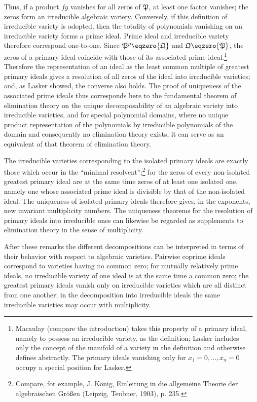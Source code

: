 \documentclass[11pt]{article}
\newcommand{\ideal}[1]{\mathfrak{#1}}
\begin{document}
Thus, if a product $fg$ vanishes for all zeros of $\ideal P$, at least one factor vanishes; the zeros form an irreducible algebraic variety. Conversely, if this definition of irreducible variety is adopted, then the totality of polynomials vanishing on an irreducible variety forms a prime ideal. Prime ideal and irreducible variety therefore correspond one-to-one. Since $\ideal P^\rho\eqzero{\ideal Q}$ and $\ideal Q\eqzero{\ideal P}$, the zeros of a primary ideal coincide with those of its associated prime ideal.\footnote{Macaulay (compare the introduction) takes this property of a primary ideal, namely to possess an irreducible variety, as the definition; Lasker includes only the concept of the manifold of a variety in the definition and otherwise defines abstractly. The primary ideals vanishing only for $x_1=0,
\ldots,x_n=0$ occupy a special position for Lasker.} Therefore the representation of an ideal as the least common multiple of greatest primary ideals gives a resolution of all zeros of the ideal into irreducible varieties; and, as Lasker showed, the converse also holds. The proof of uniqueness of the associated prime ideals thus corresponds here to the fundamental theorem of elimination theory on the unique decomposability of an algebraic variety into irreducible varieties, and for special polynomial domains, where no unique product representation of the polynomials by irreducible polynomials of the domain and consequently no elimination theory exists, it can serve as an equivalent of that theorem of elimination theory.

The irreducible varieties corresponding to the isolated primary ideals are exactly those which occur in the ``minimal resolvent'';\footnote{Compare, for example, J. König, Einleitung in die allgemeine Theorie der algebraischen Größen (Leipzig, Teubner, 1903), p. 235.} for the zeros of every non-isolated greatest primary ideal are at the same time zeros of at least one isolated one, namely one whose associated prime ideal is divisible by that of the non-isolated ideal. The uniqueness of isolated primary ideals therefore gives, in the exponents, new invariant multiplicity numbers. The uniqueness theorems for the resolution of primary ideals into irreducible ones can likewise be regarded as supplements to elimination theory in the sense of multiplicity.

After these remarks the different decompositions can be interpreted in terms of their behavior with respect to algebraic varieties. Pairwise coprime ideals correspond to varieties having no common zero; for mutually relatively prime ideals, no irreducible variety of one ideal is at the same time a common zero; the greatest primary ideals vanish only on irreducible varieties which are all distinct from one another; in the decomposition into irreducible ideals the same irreducible varieties may occur with multiplicity.
\end{document}
